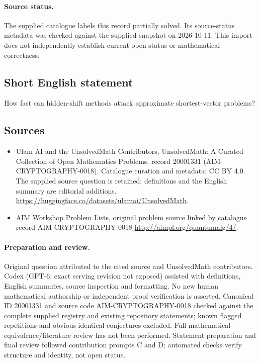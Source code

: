 \documentclass[11pt]{article}
\begin{document}
\paragraph{Source status.}
The supplied catalogue labels this record partially solved. Its source-status metadata was checked against the supplied snapshot on 2026-10-11. This import does not independently establish current open status or mathematical correctness.
\subsection{Short English statement}
How fast can hidden-shift methods attack approximate shortest-vector problems?
\subsection{Sources}
\begin{itemize}
\item[S1] Ulam AI and the UnsolvedMath Contributors, UnsolvedMath: A Curated Collection of Open Mathematics Problems, record 20001331 (AIM-CRYPTOGRAPHY-0018). Catalogue curation and metadata: CC BY 4.0. The supplied source question is retained; definitions and the English summary are editorial additions.
\url{https://huggingface.co/datasets/ulamai/UnsolvedMath}.
\item[S2] AIM Workshop Problem Lists, original problem source linked by catalogue record AIM-CRYPTOGRAPHY-0018
\url{http://aimpl.org/quantumalg/4/}.
\end{itemize}
\paragraph{Preparation and review.}
Original question attributed to the cited source and UnsolvedMath contributors. Codex (GPT-6; exact serving revision not exposed) assisted with definitions, English summaries, source inspection and formatting. No new human mathematical authorship or independent proof verification is asserted. Canonical ID 20001331 and source code AIM-CRYPTOGRAPHY-0018 checked against the complete supplied registry and existing repository statements; known flagged repetitions and obvious identical conjectures excluded. Full mathematical-equivalence/literature review has not been performed. Statement preparation and final review followed contribution prompts C and D; automated checks verify structure and identity, not open status.
\label{end:20001331}
\end{document}
